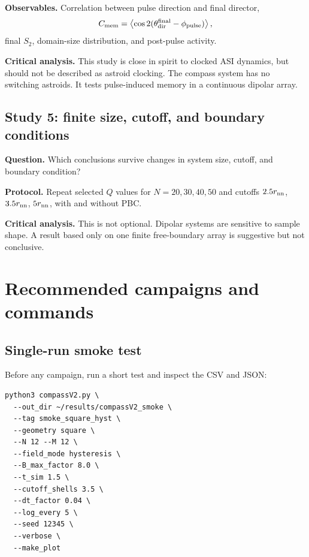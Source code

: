\documentclass[11pt,a4paper]{article}
\begin{document}
\textbf{Observables.} Correlation between pulse direction and final director,
\begin{equation}
C_{\rm mem}=\left\langle \cos 2(\theta_{\rm dir}^{\rm final}-\phi_{\rm pulse})\right\rangle,
\end{equation}
final $S_2$, domain-size distribution, and post-pulse activity.

\textbf{Critical analysis.} This study is close in spirit to clocked ASI dynamics, but should not be described as astroid clocking. The compass system has no switching astroids. It tests pulse-induced memory in a continuous dipolar array.

\subsection{Study 5: finite size, cutoff, and boundary conditions}

\textbf{Question.} Which conclusions survive changes in system size, cutoff, and boundary condition?

\textbf{Protocol.} Repeat selected $Q$ values for $N=20,30,40,50$ and cutoffs $2.5r_{\rm nn}$, $3.5r_{\rm nn}$, $5r_{\rm nn}$, with and without PBC.

\textbf{Critical analysis.} This is not optional. Dipolar systems are sensitive to sample shape. A result based only on one finite free-boundary array is suggestive but not conclusive.

\section{Recommended campaigns and commands}
\label{sec:commands}

\subsection{Single-run smoke test}

Before any campaign, run a short test and inspect the CSV and JSON:

\begin{lstlisting}[style=bashstyle]
python3 compassV2.py \
  --out_dir ~/results/compassV2_smoke \
  --tag smoke_square_hyst \
  --geometry square \
  --N 12 --M 12 \
  --field_mode hysteresis \
  --B_max_factor 8.0 \
  --t_sim 1.5 \
  --cutoff_shells 3.5 \
  --dt_factor 0.04 \
  --log_every 5 \
  --seed 12345 \
  --verbose \
  --make_plot
\end{lstlisting}
\end{document}

